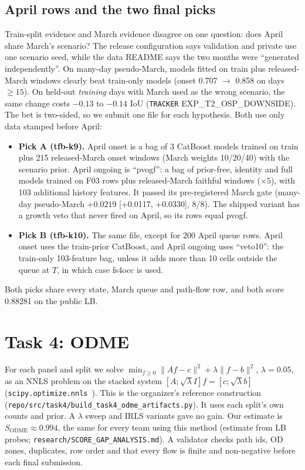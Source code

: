 \documentclass[conference,10pt]{IEEEtran}
\newcommand{\file}[1]{\texttt{\small #1}}
\begin{document}
\subsection{April rows and the two final picks}
Train-split evidence and March evidence disagree on one question: does April share March's scenario? The release
configuration says validation and private use one scenario seed, while the data README says the two months were ``generated
independently''. On many-day pseudo-March, models fitted on train plus released-March windows clearly beat train-only models (onset
0.707 $\to$ 0.858 on days $\ge15$). On held-out \emph{training} days with March used as the wrong scenario, the same change costs
$-0.13$ to $-0.14$ IoU (\file{TRACKER} EXP\_T2\_OSP\_DOWNSIDE). The bet is two-sided, so we submit one file for each hypothesis. Both use only
data stamped before April:
\begin{itemize}
\item \textbf{Pick A (tfb-k9).} April onset is a bag of 3 CatBoost models trained on train plus 215 released-March onset windows
(March weights 10/20/40) with the scenario prior. April ongoing is ``pvogf'': a bag of prior-free, identity and full models trained
on F03 rows plus released-March faithful windows ($\times5$), with 103 additional history features. It passed its pre-registered March gate
(many-day pseudo-March $+0.0219$ [+0.0117, +0.0330], 8/8). The shipped variant has a growth veto that never fired on April,
so its rows equal pvogf.
\item \textbf{Pick B (tfb-k10).} The same file, except for 200 April queue rows. April onset uses the train-prior CatBoost, and April ongoing uses
``veto10'': the train-only 103-feature bag, unless it adds more than 10 cells outside the queue at $T$, in which case fs4occ is used.
\end{itemize}
Both picks share every state, March queue and path-flow row, and both score 0.88281 on the public LB.

\section{Task 4: ODME}\label{sec:t4}
For each panel and split we solve
$\min_{f\ge0}\|Af-c\|^2+\lambda\|f-b\|^2$, $\lambda=0.05$, as an NNLS problem on the stacked system $[A;\sqrt\lambda I]f=[c;\sqrt\lambda b]$
(\file{scipy.optimize.nnls}~\cite{lawson}). This is the organizer's reference construction
(\file{repo/src/task4/build\_task4\_odme\_artifacts.py}). It uses each split's own counts and prior. A $\lambda$ sweep and IRLS
variants gave no gain. Our estimate is $S_\text{ODME}\approx0.994$, the same for every team using this method (estimate from LB probes;
\file{research/SCORE\_GAP\_ANALYSIS.md}). A validator checks path ids, OD zones, duplicates, row order and that every flow is
finite and non-negative before each final submission.
\end{document}
